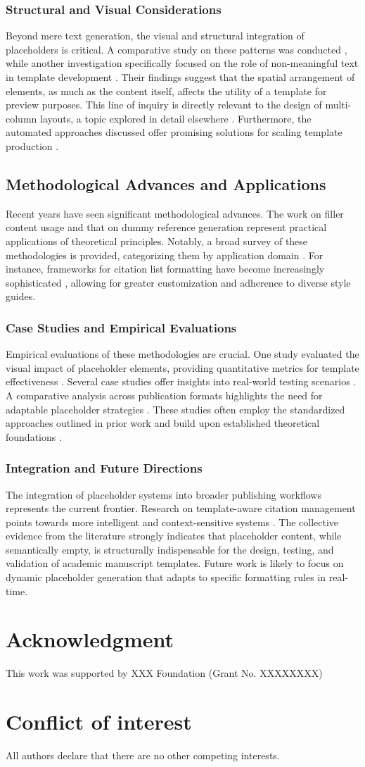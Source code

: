 \documentclass{JHD}
\begin{document}
\subsubsection{Structural and Visual Considerations}
Beyond mere text generation, the visual and structural integration of placeholders is critical. A comparative study on these patterns was conducted \cite{7}, while another investigation specifically focused on the role of non-meaningful text in template development \cite{8}. Their findings suggest that the spatial arrangement of elements, as much as the content itself, affects the utility of a template for preview purposes. This line of inquiry is directly relevant to the design of multi-column layouts, a topic explored in detail elsewhere \cite{6}. Furthermore, the automated approaches discussed offer promising solutions for scaling template production \cite{9}.
\subsection{Methodological Advances and Applications}
Recent years have seen significant methodological advances. The work on filler content usage \cite{10} and that on dummy reference generation \cite{11} represent practical applications of theoretical principles. Notably, a broad survey of these methodologies is provided, categorizing them by application domain \cite{12}. For instance, frameworks for citation list formatting have become increasingly sophisticated \cite{8,9}, allowing for greater customization and adherence to diverse style guides.
\subsubsection{Case Studies and Empirical Evaluations}
Empirical evaluations of these methodologies are crucial. One study evaluated the visual impact of placeholder elements, providing quantitative metrics for template effectiveness \cite{13}. Several case studies offer insights into real-world testing scenarios \cite{8}. A comparative analysis across publication formats highlights the need for adaptable placeholder strategies \cite{9}. These studies often employ the standardized approaches outlined in prior work \cite{14} and build upon established theoretical foundations \cite{15}.
\subsubsection{Integration and Future Directions}
The integration of placeholder systems into broader publishing workflows represents the current frontier. Research on template-aware citation management points towards more intelligent and context-sensitive systems \cite{10}. The collective evidence from the literature \cite{14,15,16,17,18,19,20} strongly indicates that placeholder content, while semantically empty, is structurally indispensable for the design, testing, and validation of academic manuscript templates. Future work is likely to focus on dynamic placeholder generation that adapts to specific formatting rules in real-time.
\section*{Acknowledgment}
This work was supported by XXX Foundation (Grant No. XXXXXXXX)
\section*{Conflict of interest}
All authors declare that there are no other competing interests.

\end{document}
